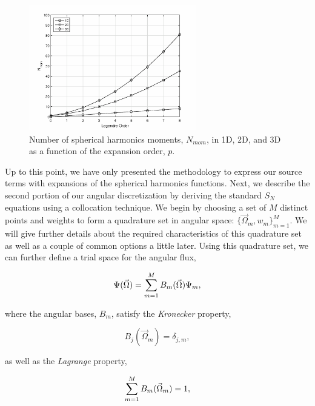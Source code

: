 \begin{figure}
\centering
\includegraphics[width=0.65\textwidth]{figures/sec_Sn/Num_Sph_Harm_Moments.eps}
\caption[Number of spherical harmonics moments]{Number of spherical harmonics moments, $N_{mom}$, in 1D, 2D, and 3D as a function of the expansion order, $p$.}
\label{fig::Sn_Num_Sph_Harm_Moments}
\end{figure}

Up to this point, we have only presented the methodology to express our source terms with expansions of the spherical harmonics functions. Next, we describe the second portion of our angular discretization by deriving the standard $S_N$ equations using a collocation technique. We begin by choosing a set of $M$ distinct points and weights to form a quadrature set in angular space: $\{  \vec{\Omega}_m, w_m \}_{m=1}^M$. We will give further details about the required characteristics of this quadrature set as well as a couple of common options a little later. Using this quadrature set, we can further define a trial space for the angular flux,

\begin{equation}
\label{eq::Sn_ang_flux_basis}
\Psi (\vec{\Omega}) = \sum\displaylimits_{m=1}^{M} B_m (\vec{\Omega})  \Psi_m ,
\end{equation}

\noindent where the angular bases, $B_m$, satisfy the {\em Kronecker} property,

\begin{equation}
\label{eq::Sn_ang_basis_kroneker}
 B_j (\vec{\Omega}_m) = \delta_{j,m}, 
\end{equation}

\noindent as well as the {\em Lagrange} property,

\begin{equation}
\label{eq::Sn_ang_basis_lagrange}
\sum\displaylimits_{m=1}^{M} B_m (\vec{\Omega}_m) = 1  ,
\end{equation}

